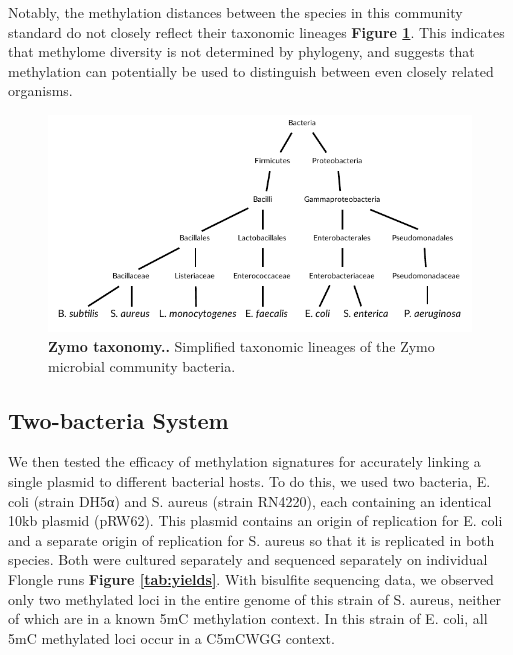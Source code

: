 Notably, the methylation distances between the species in this community standard do not closely reflect their taxonomic lineages {\bf Figure \ref{fig:taxonomy}}. This indicates that methylome diversity is not determined by phylogeny, and suggests that methylation can potentially be used to distinguish between even closely related organisms.

\begin{figure}[!hb]
\centering
\includegraphics[width = 1\linewidth,keepaspectratio]{figure/taxonomy.pdf}
\caption[Zymo taxonomy.]{{\bf Zymo taxonomy..} Simplified taxonomic lineages of the Zymo microbial community bacteria. }
\label{fig:taxonomy}
\end{figure}


\subsection{Two-bacteria System}
\label{sec:byard}

We then tested the efficacy of methylation signatures for accurately linking a single plasmid to different bacterial hosts. To do this, we used two bacteria, E. coli (strain DH5α) and S. aureus (strain RN4220), each containing an identical 10kb plasmid (pRW62). This plasmid contains an origin of replication for E. coli and a separate origin of replication for S. aureus so that it is replicated in both species. Both were cultured separately and sequenced separately on individual Flongle runs {\bf Figure \ref{tab:yields}}. With bisulfite sequencing data, we observed only two methylated loci in the entire genome of this strain of S. aureus, neither of which are in a known 5mC methylation context. In this strain of E. coli, all 5mC methylated loci occur in a C5mCWGG context.


